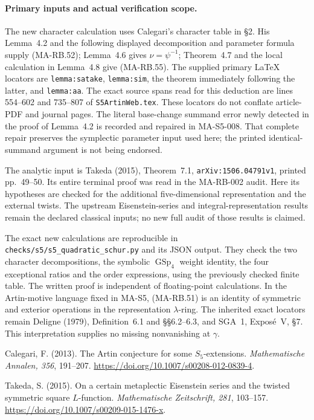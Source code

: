 \paragraph{Primary inputs and actual verification scope.}
The new character calculation uses Calegari's character
table in \S2. His Lemma~4.2 and the following displayed
decomposition and parameter formula supply (MA-RB.52);
Lemma~4.6 gives \(\nu=\psi^{-1}\); Theorem~4.7 and the
local calculation in Lemma~4.8 give (MA-RB.55).
The supplied primary LaTeX locators are
\texttt{lemma:satake}, \texttt{lemma:sim}, the theorem
immediately following the latter, and \texttt{lemma:aa}.
The exact source spans read for this deduction are
lines 554--602 and 735--807 of \texttt{S5ArtinWeb.tex}.
These locators do not conflate article-PDF and journal pages.
The literal base-change summand error newly detected in
the proof of Lemma~4.2 is recorded and repaired in
MA-S5-008. That complete repair preserves the symplectic
parameter input used here; the printed identical-summand
argument is not being endorsed.

The analytic input is Takeda (2015), Theorem~7.1,
\texttt{arXiv:1506.04791v1}, printed pp.~49--50.
Its entire terminal proof was read in the MA-RB-002 audit.
Here its hypotheses are checked for the additional
five-dimensional representation and the external twists.
The upstream Eisenstein-series and integral-representation
results remain the declared classical inputs; no new
full audit of those results is claimed.

The exact new calculations are reproducible in
\texttt{checks/s5/s5\_quadratic\_schur.py} and its JSON
output. They check the two character decompositions,
the symbolic \(\operatorname{GSp}_4\) weight identity,
the four exceptional ratios and the order expressions,
using the previously checked finite table.
The written proof is independent of floating-point
calculations. In the Artin-motive language fixed in
MA-S5, (MA-RB.51) is an identity of symmetric and exterior
operations in the representation \(\lambda\)-ring.
The inherited exact locators remain Deligne (1979),
Definition~6.1 and \S\S6.2--6.3, and SGA~1, Expos\'e~V,
\S7. This interpretation supplies no missing
nonvanishing at \(\gamma\).

Calegari, F. (2013). The Artin conjecture for some
\(S_5\)-extensions. \emph{Mathematische Annalen, 356},
191--207. \url{https://doi.org/10.1007/s00208-012-0839-4}.

Takeda, S. (2015). On a certain metaplectic Eisenstein series
and the twisted symmetric square \(L\)-function.
\emph{Mathematische Zeitschrift, 281}, 103--157.
\url{https://doi.org/10.1007/s00209-015-1476-x}.
